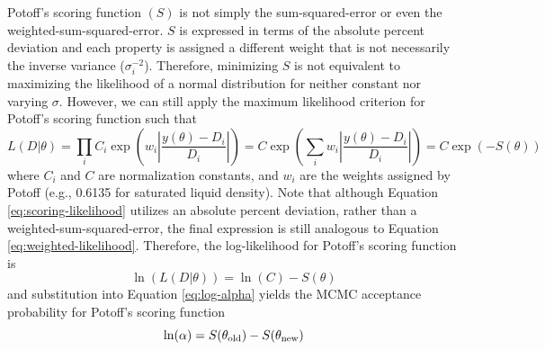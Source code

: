 \documentclass[preprint,review,11pt]{elsarticle}
\begin{document}
	
	Potoff's scoring function $(S)$ is not simply the sum-squared-error or even the weighted-sum-squared-error. $S$ is expressed in terms of the absolute percent deviation and each property is assigned a different weight that is not necessarily the inverse variance ($\sigma_i^{-2}$). Therefore, minimizing $S$ is not equivalent to maximizing the likelihood of a normal distribution for neither constant nor varying $\sigma$. However, we can still apply the maximum likelihood criterion for Potoff's scoring function such that
	\begin{equation} \label{eq:scoring-likelihood}
	L(D|\theta) = \prod_i C_i \exp\left(w_i\left|\frac{y(\theta)-D_i}{D_i}\right|\right) = C \exp\left(\sum_i w_i\left|\frac{y(\theta)-D_i}{D_i}\right|\right) = C \exp\left(-S(\theta)\right)
	\end{equation}
	where $C_i$ and $C$ are normalization constants, and $w_i$ are the weights assigned by Potoff (e.g., 0.6135 for saturated liquid density). Note that although Equation \ref{eq:scoring-likelihood} utilizes an absolute percent deviation, rather than a weighted-sum-squared-error, the final expression is still analogous to Equation \ref{eq:weighted-likelihood}. Therefore, the log-likelihood for Potoff's scoring function is
	\begin{equation}
	\ln(L(D|\theta)) = \ln(C) -S(\theta)
	\end{equation}
	and substitution into Equation \ref{eq:log-alpha} yields the MCMC acceptance probability for Potoff's scoring function
	\begin{equation} \label{eq:log-score}
	\ln(\alpha) = S(\theta_{\rm old}) - S(\theta_{\rm new})
	\end{equation}
	
\end{document}
